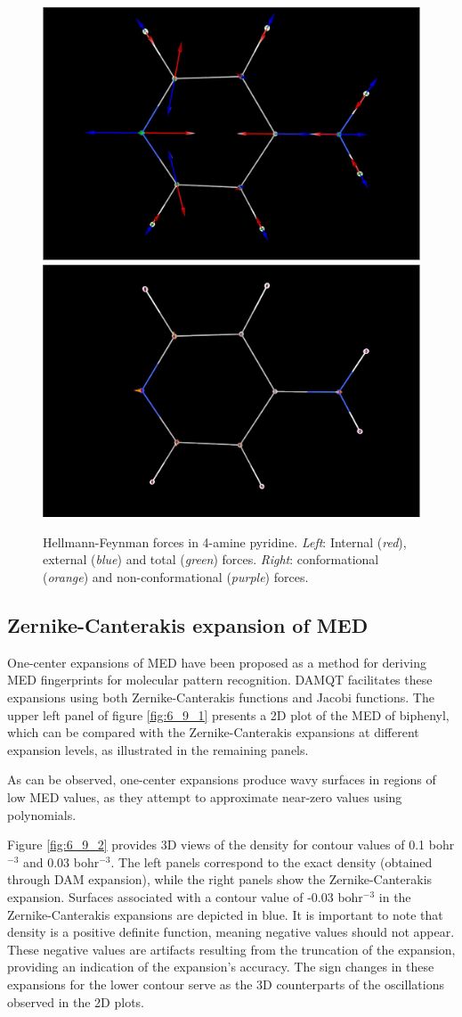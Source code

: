 \documentclass[10pt]{article}
\begin{document}
\begin{figure}[H]
\begin{center}
\includegraphics[width=.3\linewidth]{4ap-forces-1.png}
\hspace*{5mm}
\includegraphics[width=.3\linewidth]{4ap-forces-2.png}
\end{center}
\caption[Hellmann-Feynman forces in 4-amine pyridine]{ Hellmann-Feynman forces in 4-amine pyridine. 
{\it Left}: Internal ({\it red}), external ({\it blue}) and total ({\it green}) forces. 
{\it Right}: conformational ({\it orange}) and non-conformational ({\it purple}) forces.
\label{fig:6_8_1}}
\end{figure}

\subsection{Zernike-Canterakis expansion of MED \label{sec:6.9} }

One-center expansions of MED have been proposed as a method for deriving MED fingerprints 
for molecular pattern recognition. DAMQT facilitates these expansions using both 
Zernike-Canterakis functions and Jacobi functions. The upper left panel of figure 
\ref{fig:6_9_1} presents a 2D plot of the MED of biphenyl, which can be compared with 
the Zernike-Canterakis expansions at different expansion levels, as illustrated in the 
remaining panels. 

As can be observed, one-center expansions produce wavy surfaces in regions of 
low MED values, as they attempt to approximate near-zero values using polynomials. 

Figure \ref{fig:6_9_2} provides 3D views of the density for contour values of 
0.1 bohr$^{-3}$ and 0.03 bohr$^{-3}$. The left panels correspond to the exact 
density (obtained through DAM expansion), while the right panels show the 
Zernike-Canterakis expansion. Surfaces associated with a contour value of 
-0.03 bohr$^{-3}$ in the Zernike-Canterakis expansions are depicted in blue. 
It is important to note that density is a positive definite function, meaning 
negative values should not appear. These negative values are artifacts resulting 
from the truncation of the expansion, providing an indication of the expansion’s accuracy. 
The sign changes in these expansions for the lower contour serve as the 3D counterparts 
of the oscillations observed in the 2D plots.
\end{document}
